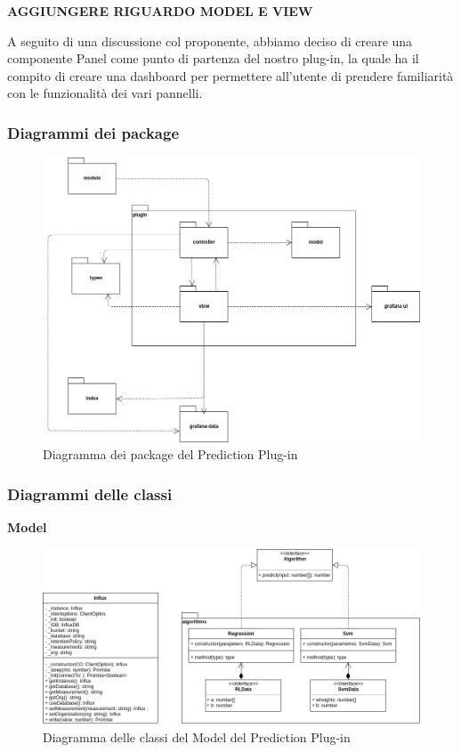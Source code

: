 \textbf{AGGIUNGERE RIGUARDO MODEL E VIEW}

A seguito di una discussione col proponente, abbiamo deciso di creare una componente Panel come punto di partenza del nostro plug-in, la quale ha il compito di creare una dashboard per permettere all’utente di prendere familiarità con le funzionalità dei vari pannelli.

\subsubsection{Diagrammi dei package}
\begin{figure}[H]
\centering
\includegraphics[scale=0.40]{../../Diagrams/Package_diagrams/plugin_design_pattern.png}
\caption{Diagramma dei package del Prediction Plug-in}
\end{figure}

\subsubsection{Diagrammi delle classi}
\textbf{Model}
\begin{figure}[H]
\centering
\includegraphics[scale=0.5]{../../Diagrams/Classes_diagrams/plugin_model.png}
\caption{Diagramma delle classi del Model del Prediction Plug-in}
\end{figure}

